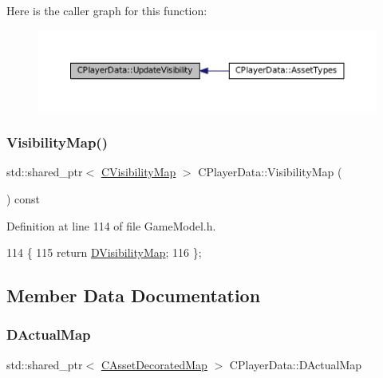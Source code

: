 Here is the caller graph for this function\+:
\nopagebreak
\begin{figure}[H]
\begin{center}
\leavevmode
\includegraphics[width=350pt]{classCPlayerData_a3ac1393306e8a3f7c95d13ca01e429a7_icgraph}
\end{center}
\end{figure}
\hypertarget{classCPlayerData_af263bd5a4864d98570d5a8a3f7986cdd}{}\label{classCPlayerData_af263bd5a4864d98570d5a8a3f7986cdd} 
\subsubsection{\texorpdfstring{Visibility\+Map()}{VisibilityMap()}}
{\footnotesize\ttfamily std\+::shared\+\_\+ptr$<$ \hyperlink{classCVisibilityMap}{C\+Visibility\+Map} $>$ C\+Player\+Data\+::\+Visibility\+Map (\begin{DoxyParamCaption}{ }\end{DoxyParamCaption}) const\hspace{0.3cm}{\ttfamily [inline]}}



Definition at line 114 of file Game\+Model.\+h.


\begin{DoxyCode}
114                                                              \{
115             \textcolor{keywordflow}{return} \hyperlink{classCPlayerData_a804ea65e7ec7c90b2e335414d106cc78}{DVisibilityMap};  
116         \};
\end{DoxyCode}


\subsection{Member Data Documentation}
\hypertarget{classCPlayerData_a943801106af1d7ad52abd73d32552186}{}\label{classCPlayerData_a943801106af1d7ad52abd73d32552186} 
\subsubsection{\texorpdfstring{D\+Actual\+Map}{DActualMap}}
{\footnotesize\ttfamily std\+::shared\+\_\+ptr$<$ \hyperlink{classCAssetDecoratedMap}{C\+Asset\+Decorated\+Map} $>$ C\+Player\+Data\+::\+D\+Actual\+Map\hspace{0.3cm}{\ttfamily [protected]}}



